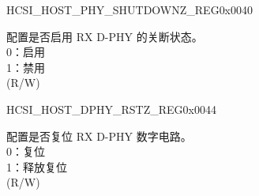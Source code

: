 \begin{register}{H}{CSI\_HOST\_PHY\_SHUTDOWNZ\_REG}{0x0040}\label{regdesc:CSIHOSTPHYSHUTDOWNZREG}
%
%
\regnewline%
\begin{regdesc}\begin{reglist}
\label{fielddesc:CSIHOSTPHYSHUTDOWNZ}\item [CSI\_HOST\_PHY\_SHUTDOWNZ] 配置是否启用 RX D-PHY 的关断状态。\\ 
0：启用 \\
1：禁用 \\
(R/W)
\end{reglist}\end{regdesc}
\end{register}


\begin{register}{H}{CSI\_HOST\_DPHY\_RSTZ\_REG}{0x0044}\label{regdesc:CSIHOSTDPHYRSTZREG}
%
%
\regnewline%
\begin{regdesc}\begin{reglist}
\label{fielddesc:CSIHOSTDPHYRSTZ}\item [CSI\_HOST\_DPHY\_RSTZ] 配置是否复位 RX D-PHY 数字电路。 \\ 
0：复位 \\
1：释放复位 \\
(R/W)
\end{reglist}\end{regdesc}
\end{register}


